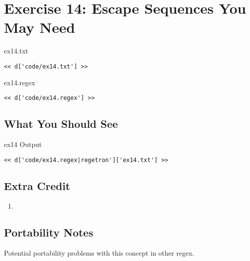 \chapter{Exercise 14: Escape Sequences You May Need}



\begin{code}{ex14.txt}
\begin{Verbatim}
<< d['code/ex14.txt'] >>
\end{Verbatim}
\end{code}


\begin{code}{ex14.regex}
\begin{Verbatim}
<< d['code/ex14.regex'] >>
\end{Verbatim}
\end{code}


\section{What You Should See}


\begin{code}{ex14 Output}
\begin{Verbatim}
<< d['code/ex14.regex|regetron']['ex14.txt'] >>
\end{Verbatim}
\end{code}


\section{Extra Credit}

\begin{enumerate}
\item 
\end{enumerate}

\section{Portability Notes}

Potential portability problems with this concept in other regex.
